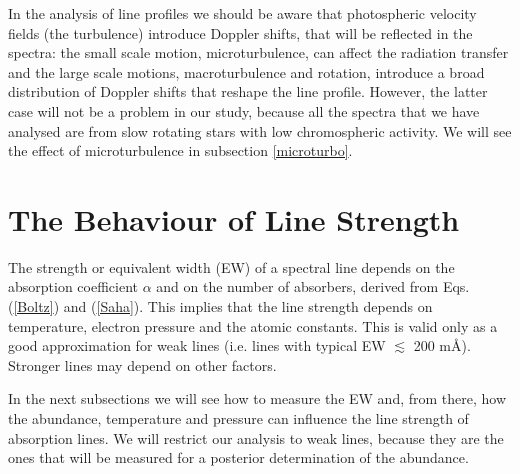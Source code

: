 \documentclass[dvips,12pt,a4paper]{report}
\begin{document}
{%




In the analysis of line profiles we should be aware that photospheric velocity fields (the turbulence) introduce Doppler shifts, that will be reflected in the spectra: the small scale motion, microturbulence, can affect the radiation transfer and the large scale motions, macroturbulence and rotation, introduce a broad distribution of Doppler shifts that reshape the line profile. However, the latter case will not be a problem in our study, because all the spectra that we have analysed are from slow rotating stars with low chromospheric activity. We will see the effect of microturbulence in subsection \ref{microturbo}.






\section{The Behaviour of Line Strength}
\label{linestr}
The strength or equivalent width (EW) of a spectral line depends on the absorption coefficient $\alpha$ and on the number of absorbers, derived from Eqs. (\ref{Boltz}) and (\ref{Saha}). This implies that the line strength depends on temperature, electron pressure and the atomic constants. This is valid only as a good approximation for weak lines (i.e. lines with typical EW $\lesssim$ 200 m\AA). Stronger lines may depend on other factors. 

In the next subsections we will see how to measure the EW and, from there, how the abundance, temperature and pressure can influence the line strength of absorption lines. We will restrict our analysis to weak lines, because they are the ones that will be measured for a posterior determination of the abundance. 

}
\end{document}
